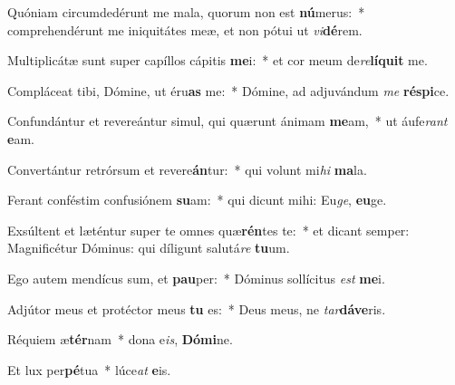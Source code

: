 \item Quóniam circumdedérunt me mala, quorum non est \textbf{nú}merus:~* comprehendérunt me iniquitátes meæ, et non pótui ut \textit{vi}\textbf{dé}rem.

\item Multiplicátæ sunt super capíllos cápitis \textbf{me}i:~* et cor meum de\textit{re}\textbf{lí}\textbf{quit} me.

\item Compláceat tibi, Dómine, ut éru\textbf{as} me:~* Dómine, ad adjuvándum \textit{me} \textbf{ré}\textbf{spi}ce.

\item Confundántur et revereántur simul, qui quærunt ánimam \textbf{me}am,~* ut áufe\textit{rant} \textbf{e}am.

\item Convertántur retrórsum et revere\textbf{án}tur:~* qui volunt mi\textit{hi} \textbf{ma}la.

\item Ferant conféstim confusiónem \textbf{su}am:~* qui dicunt mihi: Eu\textit{ge}, \textbf{eu}ge.

\item Exsúltent et læténtur super te omnes quæ\textbf{rén}tes te:~* et dicant semper: Magnificétur Dóminus: qui díligunt salutá\textit{re} \textbf{tu}um.

\item Ego autem mendícus sum, et \textbf{pau}per:~* Dóminus sollícitus \textit{est} \textbf{me}i.

\item Adjútor meus et protéctor meus \textbf{tu} es:~* Deus meus, ne \textit{tar}\textbf{dá}\textbf{ve}ris.

\item Réquiem æ\textbf{tér}nam~* dona e\textit{is}, \textbf{Dó}\textbf{mi}ne.

\item Et lux per\textbf{pé}tua~* lúce\textit{at} \textbf{e}is.